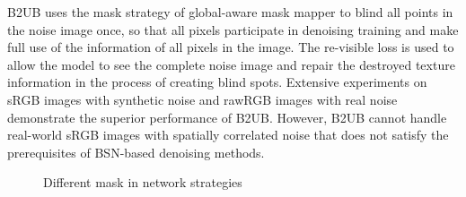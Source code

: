 \documentclass[conference]{IEEEtran}
\begin{document}
B2UB uses the mask strategy of global-aware mask mapper to blind all points in the noise image once, so that all pixels participate in denoising training and make full use of the information of all pixels in the image. The re-visible loss is used to allow the model to see the complete noise image and repair the destroyed texture information in the process of creating blind spots. Extensive experiments on sRGB images with synthetic noise and rawRGB images with real noise demonstrate the superior performance of B2UB. However, B2UB cannot handle real-world sRGB images with spatially correlated noise that does not satisfy the prerequisites of BSN-based denoising methods.

\begin{figure*}[htbp]
	\setlength{\abovecaptionskip}{0cm}
	\setlength{\belowcaptionskip}{0cm}
	\centering
     \begin{minipage}[b]{0.32\linewidth}
	\end{minipage}
     \begin{minipage}[b]{0.34\linewidth}
	\end{minipage}
     \begin{minipage}[b]{0.32\linewidth}
	\end{minipage}
	\caption{Different mask in network strategies}
	\label{fig:figure 3}
\vspace{-1em}
\end{figure*}
\end{document}
